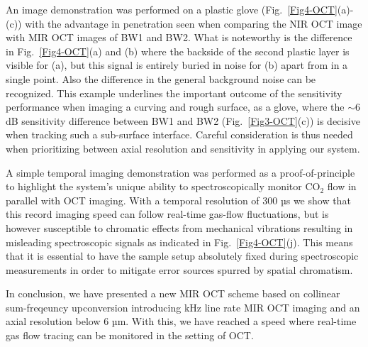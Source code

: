 \documentclass[9pt,twocolumn]{extarticle}
\begin{document}

An image demonstration was performed on a plastic glove (Fig.~\ref{Fig4-OCT}(a)-(c)) with the advantage in penetration seen when comparing the NIR OCT image with MIR OCT images of BW1 and BW2. What is noteworthy is the difference in Fig.~\ref{Fig4-OCT}(a) and (b) where the backside of the second plastic layer is visible for (a), but this signal is entirely buried in noise for (b) apart from in a single point. Also the difference in the general background noise can be recognized. This example underlines the important outcome of the sensitivity performance when imaging a curving and rough surface, as a glove, where the $\sim6$ dB sensitivity difference between BW1 and BW2 (Fig.~\ref{Fig3-OCT}(c)) is decisive when tracking such a sub-surface interface. Careful consideration is thus needed when prioritizing between axial resolution and sensitivity in applying our system. 

A simple temporal imaging demonstration was performed as a proof-of-principle to highlight the system's unique ability to spectroscopically monitor CO$_2$ flow in parallel with OCT imaging. With a temporal resolution of 300 µs we show that this record imaging speed can follow real-time gas-flow fluctuations, but is however susceptible to chromatic effects from mechanical vibrations resulting in misleading spectroscopic signals as indicated in Fig.~\ref{Fig4-OCT}(j). This means that it is essential to have the sample setup absolutely fixed during spectroscopic measurements in order to mitigate error sources spurred by  spatial chromatism.

In conclusion, we have presented a new MIR OCT scheme based on collinear sum-freqeuncy upconversion introducing kHz line rate MIR OCT imaging and an axial resolution below 6 µm. With this, we have reached a speed where real-time gas flow tracing can be monitored in the setting of OCT. 
\end{document}
